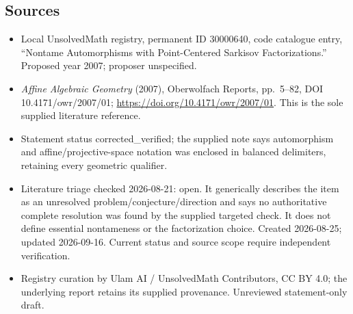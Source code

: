 \documentclass[11pt]{article}
\begin{document}
\subsection{Sources}
\begin{itemize}
\item Local UnsolvedMath registry, permanent ID 30000640, code catalogue entry, ``Nontame Automorphisms with Point-Centered Sarkisov Factorizations.'' Proposed year 2007; proposer unspecified.
\item \emph{Affine Algebraic Geometry} (2007), Oberwolfach Reports, pp.\ 5--82, DOI 10.4171/owr/2007/01; \url{https://doi.org/10.4171/owr/2007/01}. This is the sole supplied literature reference.
\item Statement status corrected\_verified; the supplied note says automorphism and affine/projective-space notation was enclosed in balanced delimiters, retaining every geometric qualifier.
\item Literature triage checked 2026-08-21: open. It generically describes the item as an unresolved problem/conjecture/direction and says no authoritative complete resolution was found by the supplied targeted check. It does not define essential nontameness or the factorization choice. Created 2026-08-25; updated 2026-09-16. Current status and source scope require independent verification.
\item Registry curation by Ulam AI / UnsolvedMath Contributors, CC BY 4.0; the underlying report retains its supplied provenance. Unreviewed statement-only draft.
\end{itemize}
\end{document}
